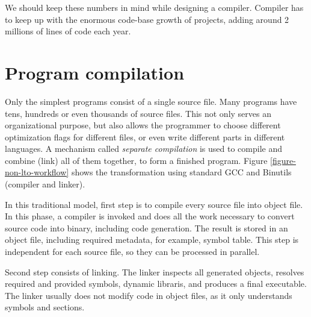 We should keep these numbers in mind while designing a compiler. Compiler has
to keep up with the enormous code-base growth of projects, adding around 2
millions of lines of code each year.

\section{Program compilation}

Only the simplest programs consist of a single source file. Many programs have
tens, hundreds or even thousands of source files. This not only serves an
organizational purpose, but also allows the programmer to choose different
optimization flags for different files, or even write different parts in
different languages. A mechanism called {\sl separate compilation} is used to
compile and combine (link) all of them together, to form a finished program.
Figure \ref{figure-non-lto-workflow} shows the transformation using standard GCC
and Binutils (compiler and linker).

In this traditional model, first step is to compile every  source file into
object file. In this phase, a compiler is invoked and does all the work
necessary to convert source code into binary, including code generation. The
result is stored in an object file, including required metadata, for example,
symbol table. This step is independent for each source file, so they can be
processed in parallel. 

Second step consists of linking. The linker inspects all generated objects,
resolves required and provided symbols, dynamic libraris, and produces a
final executable. The linker usually does not modify code in object files, as it
only understands symbols and sections.


